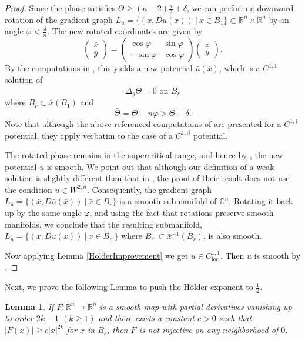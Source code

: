 \documentclass[12pt,reqno]{amsart}%
\theoremstyle{plain}
\newtheorem{lemma}[theorem]{Lemma}
\numberwithin{equation}{section}
\theoremstyle{definition}
\theoremstyle{remark}
\newcommand{\C}{\mathbb{C}}
\newcommand{\R}{\mathbb{R}}
\begin{document}
\begin{proof} 
Since the phase satisfies 
$\Theta \geq (n-2)\frac \pi 2 +\delta$, we can perform a downward rotation of the gradient graph $L_u=\{(x,Du(x))\: |\: x\in B_1\}\subset\R^n\times \R^n$ by an angle $\varphi  < \frac \delta n$. The new rotated coordinates are given by
$$ \begin{pmatrix} 
\bar x \\ \bar y 
\end{pmatrix} 
= 
\begin{pmatrix} 
\cos \varphi &  \sin \varphi 
\\ -\sin \varphi &\cos \varphi
\end{pmatrix} 
\begin{pmatrix} 
x \\ y
\end{pmatrix}.$$
By the computations in \cite[Section 4]{ChenWarren}, this yields a new potential $\bar u(\bar x)$, which is a $C^{1,1}$ solution of 
\[
\Delta_g \bar \Theta=0 \text{ on } B_{r}
\] 
where $B_{r}\subset\bar x(B_1)$ and
\[
\bar \Theta=\Theta -n\varphi>\Theta-\delta.
\] 
Note that although the above-referenced computations of \cite[Section 4]{ChenWarren} are presented for a $C^{1,1}$ potential, they apply verbatim to the case of a $C^{1,\beta}$ potential.

The rotated phase remains in the supercritical range, and hence by \cite[Theorem 1.2]{ChenWarren}, the new potential $\bar u$ is smooth. We point out that although our definition of a weak solution is slightly different than that in \cite{ChenWarren}, the proof of their result does not use the condition $u \in W^{2,n}$. Consequently, the gradient graph $ L_{\bar u}= \{ (\bar x , D \bar u (\bar x)) \: \vert \: \bar x \in B_r\} $ is a smooth submanifold of $\C^n$. Rotating it back up by the same angle $\varphi$, and using the fact that rotations preserve smooth manifolds, we conclude that the resulting submanifold, $L_u= \{ (x, D u (x) )\: \vert\: x\in B_{r'}\}$  where $B_{r'} \subset \bar x^{-1}(B_r)$, is also smooth.

 Now applying Lemma \ref{HolderImprovement} we get  $u \in C^{1,1}_{\mathrm{loc}}$. Then $u$ is smooth by \cite[Theorem 1.2]{ChenWarren}.
\end{proof} 

Next, we prove the following Lemma to push the H\"older exponent to $\frac{1}{2}$.

\begin{lemma}\label{Noninjective} If $F : \R^n \to \R^n$ is a smooth map with partial derivatives vanishing up to order $2k-1$ $(k \geq 1)$ and there exists a constant $c>0$ such that $|F(x)| \geq c |x|^{2k} $ for $x$ in $B_r$, then $F$ is not injective on any neighborhood of $0$. 
\end{lemma} 
\end{document}
